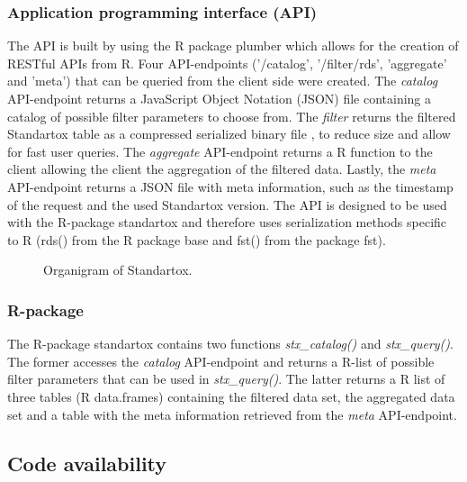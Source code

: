 \subsubsection*{Application programming interface (API)}
The API is built by using the R package plumber \citep{trestletechnologyllc_plumber_2018} which allows for the creation of RESTful APIs from R. Four API-endpoints ('/catalog', '/filter/rds', 'aggregate' and 'meta') that can be queried from the client side were created. The \textit{catalog} API-endpoint returns a JavaScript Object Notation (JSON) file containing a catalog of possible filter parameters to choose from. The \textit{filter} returns the filtered Standartox table as a compressed serialized binary file \citep{klik_fst_2019}, to reduce size and allow for fast user queries. The \textit{aggregate} API-endpoint returns a R function to the client allowing the client the aggregation of the filtered data. Lastly, the \textit{meta} API-endpoint returns a JSON file with meta information, such as the timestamp of the request and the used Standartox version. The API is designed to be used with the R-package standartox and therefore uses serialization methods specific to R (rds() from the R package base and fst() from the package fst).

\begin{figure}
    
    \caption{Organigram of Standartox.}
    \label{fig:stx-organigram}
\end{figure}


\subsubsection*{R-package}
The R-package standartox contains two functions \textit{stx\_catalog()} and \textit{stx\_query()}. The former accesses the \textit{catalog} API-endpoint and returns a R-list of possible filter parameters that can be used in \textit{stx\_query()}. The latter returns a R list of three tables (R data.frames) containing the filtered data set, the aggregated data set and a table with the meta information retrieved from the \textit{meta} API-endpoint.

\subsection*{Code availability}

